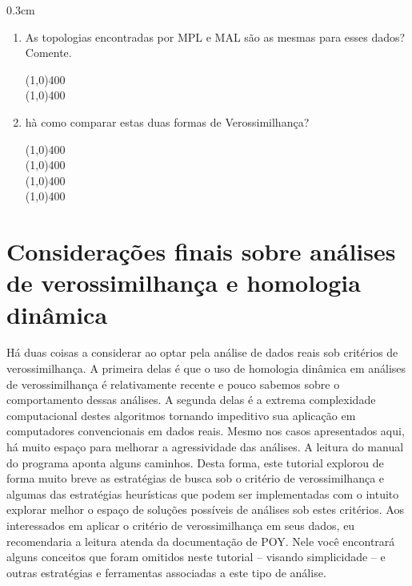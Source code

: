 \begin{refsection}
\begin {myindentpar}{0.3cm}
\begin{enumerate}[\itshape i.]

	\item{As topologias encontradas por MPL e MAL são as mesmas para esses dados? Comente.}

\begin{center}
\line(1,0){400}\\
\line(1,0){400}\\
\end{center}


	\item{hà como comparar estas duas formas de Verossimilhança?}

\begin{center}
\line(1,0){400}\\
\line(1,0){400}\\
\line(1,0){400}\\
\line(1,0){400}\\

\end{center}

\end{enumerate}
\end{myindentpar}

\section{Considerações finais sobre análises de verossimilhança e homologia dinâmica}\label{tut13:mldo}

Há duas coisas a considerar ao optar pela análise de dados reais sob critérios de verossimilhança. A primeira delas é que o uso de homologia dinâmica em análises de verossimilhança é relativamente recente e pouco sabemos sobre o comportamento dessas análises. A segunda delas é a extrema complexidade computacional destes algoritmos tornando impeditivo sua aplicação em computadores convencionais em dados reais. Mesmo nos casos apresentados aqui, há muito espaço para melhorar a agressividade das análises. A leitura do manual do programa aponta alguns caminhos. Desta forma, este tutorial explorou de forma muito breve as estratégias de busca sob o critério de verossimilhança e algumas das estratégias heurísticas que podem ser implementadas com o intuito explorar melhor o espaço de soluções possíveis de análises sob estes critérios. Aos interessados em aplicar o critério de verossimilhança em seus dados, eu recomendaria a leitura atenda da documentação de POY. Nele você encontrará alguns conceitos que foram omitidos neste tutorial -- visando simplicidade -- e outras estratégias e ferramentas associadas a este tipo de análise.\\


\end{refsection}
